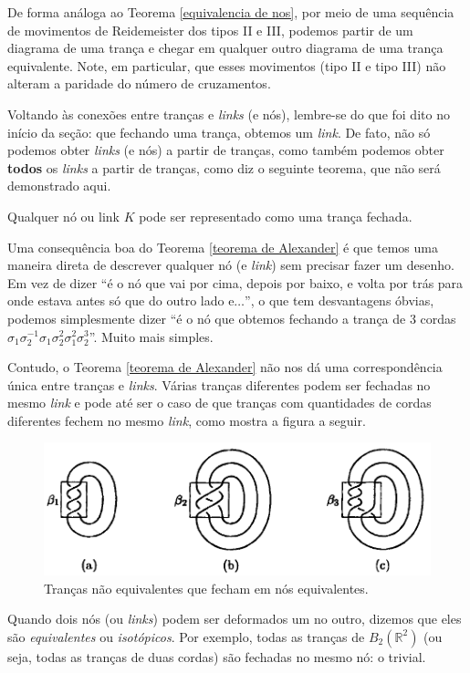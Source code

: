 	\par\vspace{0.3cm} De forma análoga ao Teorema \ref{equivalencia de nos}, por meio de uma 
	sequência de movimentos de Reidemeister dos tipos II e III, podemos partir de um diagrama 
	de uma trança e chegar em qualquer outro diagrama de uma trança equivalente. 
	Note, em particular, que esses movimentos (tipo II e tipo III) não alteram a paridade do 
	número de cruzamentos.
	
	\par\vspace{0.3cm} Voltando às conexões entre tranças e \textit{links} (e nós), lembre-se 
	do que foi dito no início da seção: que fechando uma trança, obtemos um \textit{link}. 
	De fato, não só podemos obter \textit{links} (e nós) a partir de tranças, como também 
	podemos obter \textbf{todos} os \textit{links} a partir de tranças, como diz o seguinte 
	teorema, que não será demonstrado aqui.
	\begin{theorem}
	\label{teorema de Alexander}
		Qualquer nó ou link $K$ pode ser representado como uma trança fechada.
	\end{theorem}
	Uma consequência boa do Teorema \ref{teorema de Alexander} é que temos uma maneira direta de 
	descrever qualquer nó (e \textit{link}) sem precisar fazer um desenho. Em vez de dizer 
	``é o nó que vai por cima, depois por baixo, e volta por trás para onde estava antes só que 
	do outro lado e$\dots$'', o que tem desvantagens óbvias, podemos simplesmente dizer ``é o nó 
	que obtemos fechando a trança de 3 cordas $\sigma_1\sigma_2^{-1}\sigma_1\sigma_2^2\sigma_1^2\sigma_2^3$''.
	Muito mais simples.
	
	\par\vspace{0.3cm} Contudo, o Teorema \ref{teorema de Alexander} não nos dá uma correspondência 
	única entre tranças e \textit{links}. Várias tranças diferentes podem ser fechadas no mesmo 
	\textit{link} e pode até ser o caso de que tranças com quantidades de cordas diferentes 
	fechem no mesmo \textit{link}, como mostra a figura a seguir.
	\begin{figure}[H]
		\begin{center}
			\includegraphics[width=12cm]{Images/fechamento_de_trancas_em_nos.png}
		\end{center}\caption{Tranças não equivalentes que fecham em nós equivalentes.}
		\label{fechamento de trancas em nos}
	\end{figure}
	Quando dois nós (ou \textit{links}) podem ser deformados um no outro, dizemos que eles 
	são \textit{equivalentes} ou \textit{isotópicos}. Por exemplo, todas as tranças de 
	$B_2(\mathbb{R}^2)$ (ou seja, todas as tranças de duas cordas) são fechadas no 
	mesmo nó: o trivial.
	
